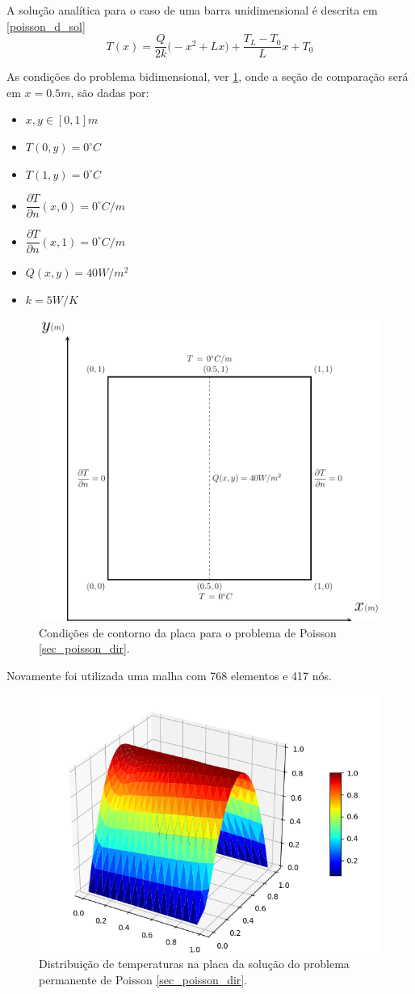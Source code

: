 A solução analítica para o caso de uma barra unidimensional é descrita em \ref{poisson_d_sol}
\begin{equation}
    T(x) = \dfrac{Q}{2k}\Big(-x^2 + L x\Big) + \dfrac{T_L-T_0}{L} x + T_0
    \label{poisson_d_sol} 
\end{equation}

As condições do problema bidimensional, ver \ref{poisson_d_bc}, onde a seção de comparação será em $x=0.5m$, são dadas por:
\begin{itemize}
    \item $x,y\in [0,1]m$
    \item $T(0,y) = 0^{\circ}C$
    \item $T(1,y) = 0^{\circ}C$
    \item $\dfrac{\partial T}{\partial n}(x,0) = 0^{\circ}C/m$
    \item $\dfrac{\partial T}{\partial n}(x,1) = 0^{\circ}C/m$
    \item $Q(x,y) = 40W/m^2$
    \item $k = 5W/K$
\end{itemize}

\begin{figure}[H]
    \centering
    \includegraphics[width=.7\linewidth]{figures/poisson_dirichlet_boundary_conditions.pdf}
    \caption{Condições de contorno da placa para o problema de Poisson \ref{sec_poisson_dir}.}
    \label{poisson_d_bc}
\end{figure}

Novamente foi utilizada uma malha com 768 elementos e 417 nós.
\begin{figure}[H]
    \centering
    \includegraphics[width=.5\linewidth]{figures/poisson_dirichlet_permanent_3d.png}
    \caption{Distribuição de temperaturas na placa da solução do problema permanente de Poisson \ref{sec_poisson_dir}.}
    \label{poisson_d_3d}
\end{figure}

